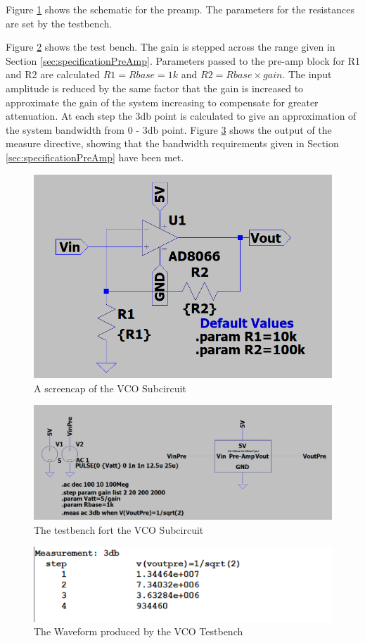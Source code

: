 Figure \ref{fig:preAmpSchematic} shows the schematic for the preamp.
The parameters for the resistances are set by the testbench.

Figure \ref{fig:preAmpTestBench} shows the test bench. 
The gain is stepped across the range given in Section \ref{sec:specificationPreAmp}.
Parameters passed to the pre-amp block for R1 and R2 are calculated \(R1 = Rbase = 1k\) and \(R2 = Rbase \times gain\).
The input amplitude is reduced by the same factor that the gain is increased to approximate the gain of the system increasing to compensate for greater attenuation.
At each step the 3db point is calculated to give an approximation of the system bandwidth from 0 - 3db point. 
Figure \ref{fig:preAmpTestBenchOutput} shows the output of the measure directive, showing that the bandwidth requirements given in Section \ref{sec:specificationPreAmp} have been met.  

\begin{figure}[H]
    \centering 
    \includegraphics[width=\textwidth]{../Circuits/Images/Pre-Amp/Schematic}
    \caption{A screencap of the VCO Subcircuit}
    \label{fig:preAmpSchematic}
\end{figure}

\begin{figure}[H]
    \centering 
    \includegraphics[width=\textwidth]{../Circuits/Images/Pre-Amp/TestBenchScreencap}
    \caption{The testbench fort the VCO Subcircuit}
    \label{fig:preAmpTestBench}
\end{figure}

\begin{figure}[H]
    \centering 
    \includegraphics[width=\textwidth]{../Circuits/Images/Pre-Amp/TestBenchOutput}
    \caption{The Waveform produced by the VCO Testbench}
    \label{fig:preAmpTestBenchOutput}
\end{figure}

